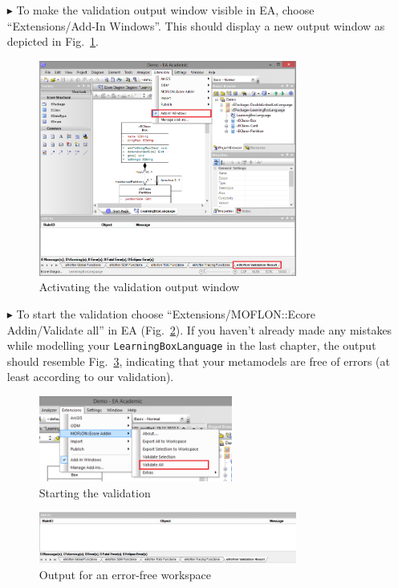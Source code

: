 \begin{enumerate}
\item[$\blacktriangleright$] To make the validation output window visible in EA, choose ``Extensions/\-Add-In Windows''.
This should display a new output window as depicted in Fig.~\ref{fig:validation_output}.

\begin{figure}[htbp]
	\centering
  \includegraphics[width=0.8\textwidth]{pics/memBoxBilder/memBox40}
	\caption{Activating the validation output window}
	\label{fig:validation_output}
\end{figure}

\item[$\blacktriangleright$] To start the validation choose ``Extensions/\-MOFLON::Ecore Addin/\-Validate all'' in EA (Fig.~\ref{fig:validation_menu}).
If you haven't already made any mistakes while modelling your \texttt{LearningBoxLanguage} in the last chapter, the output should resemble Fig.~\ref{fig:first_validation}, indicating that your metamodels are free of errors (at least according to our validation).

\begin{figure}[htbp]
	\centering
  \includegraphics[width=0.6\textwidth]{pics/memBoxBilder/memBox41}
	\caption{Starting the validation}
	\label{fig:validation_menu}
\end{figure}

\begin{figure}[htbp]
	\centering
  \includegraphics[width=0.8\textwidth]{pics/memBoxBilder/memBox42}
	\caption{Output for an error-free workspace}
	\label{fig:first_validation}
\end{figure}
\end{enumerate}


